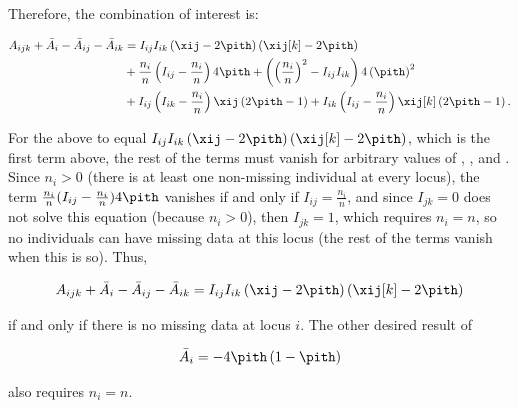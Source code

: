 \documentclass[11pt]{article}
\begin{document}
\begin{linenumbers}
\begin{appendices}
  Therefore, the combination of interest is:
  \begin{linenomath*}
  \begin{align*}
    A_{ijk} + \bar{A}_i - \bar{A}_{ij}  - \bar{A}_{ik}
    &=
      I_{ij} I_{ik} \left( \xij - 2 \pith \right) \left( \xij[k] - 2 \pith \right)
    \\
      &+ \frac{n_i}{n} \left( I_{ij} - \frac{n_i}{n} \right) 4 \pith
        + \left( \left( \frac{n_i}{n} \right)^2 -  I_{ij} I_{ik} \right) 4 \left( \pith \right)^2
    \\
      &+ I_{ij} \left( I_{ik} - \frac{n_i}{n} \right) \xij \left( 2 \pith - 1 \right)
      + I_{ik} \left( I_{ij} - \frac{n_i}{n} \right) \xij[k] \left( 2 \pith - 1 \right)
      .
  \end{align*}
  \end{linenomath*}
  For the above to equal $I_{ij} I_{ik} \left( \xij - 2 \pith \right) \left( \xij[k] - 2 \pith \right)$, which is the first term above, the rest of the terms must vanish for arbitrary values of \pith, \xij, and \xij[k].
  Since $n_i > 0$ (there is at least one non-missing individual at every locus), the term $\frac{n_i}{n} ( I_{ij} - \frac{n_i}{n} ) 4 \pith$ vanishes if and only if $I_{ij} = \frac{n_i}{n}$, and since $I_{jk}=0$ does not solve this equation (because $n_i > 0$), then $I_{jk}=1$, which requires $n_i=n$, so no individuals can have missing data at this locus (the rest of the terms vanish when this is so).
  Thus,
  \begin{linenomath*}
  $$
  A_{ijk} + \bar{A}_i - \bar{A}_{ij}  - \bar{A}_{ik}
  =
  I_{ij} I_{ik} \left( \xij - 2 \pith \right) \left( \xij[k] - 2 \pith \right)
  $$
  \end{linenomath*}
  if and only if there is no missing data at locus $i$.
  The other desired result of
  \begin{linenomath*}
  $$
  \bar{A}_i
  =
  - 4 \pith \left( 1 - \pith \right)
  $$
  \end{linenomath*}
  also requires $n_i = n$.


\end{appendices}
\end{linenumbers}
\end{document}
